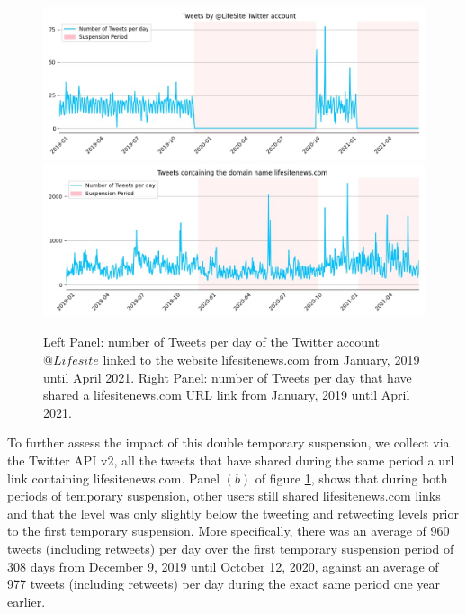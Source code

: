 \documentclass{article}
\begin{document}
\begin{figure}[h]
\hspace{-2em}
		\includegraphics[scale=0.32]{../figure/lifesite.jpg} 
		\includegraphics[scale=0.32]{../figure/lifesite_domain.jpg}
\caption{Left Panel: number of Tweets per day of the Twitter account $@Lifesite$ linked to the website lifesitenews.com from January, 2019 until April 2021. Right Panel: number of Tweets per day that have shared a lifesitenews.com URL link from January, 2019 until April 2021. }
\label{fig2}
\end{figure}

To further assess the impact of this double temporary suspension, we collect via the Twitter API v2, all the tweets that have shared during the same period a url link containing lifesitenews.com. Panel $(b)$ of figure \ref{fig2}, shows that during both periods of temporary suspension, other users still shared lifesitenews.com links and that the level was only slightly below the tweeting and retweeting levels prior to the first temporary suspension. More specifically, there was an average of 960 tweets (including retweets) per day over the first temporary suspension period of 308 days from December 9, 2019 until October 12, 2020, against an average of 977 tweets (including retweets) per day during the exact same period one year earlier. 
\end{document}
